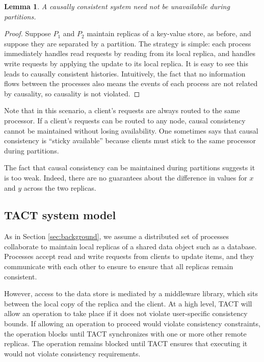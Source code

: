 \documentclass[]             %
{NASA}                       %
\newtheorem{lemma}[theorem]{Lemma}
\theoremstyle{definition}
\begin{document}
\begin{lemma}
  A causally consistent system need not be unavailabile during partitions.
\end{lemma}
\begin{proof}

  Suppose $P_1$ and $P_2$ maintain replicas of a key-value store, as
  before, and suppose they are separated by a partition. The strategy is
  simple: each process immediately handles read requests by reading from
  its local replica, and handles write requests by applying the update
  to its local replica. It is easy to see this leads to causally
  consistent histories. Intuitively, the fact that no information flows
  between the processes also means the events of each process are not
  related by causality, so causality is not violated.  \end{proof}

Note that in this scenario, a client's requests are always routed to the
same processor. If a client's requests can be routed to any node, causal
consistency cannot be maintained without losing availability. One
sometimes says that causal consistency is ``sticky available'' because
clients must stick to the same processor during partitions.

The fact that causal consistency can be maintained during partitions
suggests it is too weak. Indeed, there are no guarantees about the
difference in values for \(x\) and \(y\) across the two replicas.

\hypertarget{tact-system-model}{%
  \subsection{TACT system model}\label{tact-system-model}}

As in Section \ref{sec:background}, we assume a distributed set of
processes collaborate to maintain local replicas of a shared data object
such as a database. Processes accept read and write requests from
clients to update items, and they communicate with each other to ensure
to ensure that all replicas remain consistent.

However, access to the data store is mediated by a middleware library,
which sits between the local copy of the replica and the client. At a
high level, TACT will allow an operation to take place if it does not
violate user-specific consistency bounds. If allowing an operation to
proceed would violate consistency constraints, the operation blocks
until TACT synchronizes with one or more other remote replicas. The
operation remains blocked until TACT ensures that executing it would not
violate consistency requirements.
\end{document}
